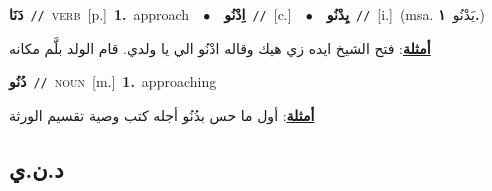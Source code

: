 \documentclass[10pt,a4paper,twoside]{article} %
\begin{document}
\begin{multicols}{2}
{\setlength\topsep{0pt}\textbf{\foreignlanguage{arabic}{دَنَا}}\ {\color{gray}\texttt{//}\color{black}}\ \textsc{verb}\ [p.]\ \textbf{1.}~approach\ \ $\bullet$\ \ \setlength\topsep{0pt}\textbf{\foreignlanguage{arabic}{اِدْنُو}}\ {\color{gray}\texttt{//}\color{black}}\ [c.]\ \ $\bullet$\ \ \setlength\topsep{0pt}\textbf{\foreignlanguage{arabic}{يِدْنُو}}\ {\color{gray}\texttt{//}\color{black}}\ [i.]\ \color{gray}(msa. \foreignlanguage{arabic}{يَدْنُو}~\foreignlanguage{arabic}{\textbf{١.}})\color{black}\  \begin{flushright}\color{gray}\foreignlanguage{arabic}{\textbf{\underline{\foreignlanguage{arabic}{أمثلة}}}: فتح الشيخ ايده زي هيك وقاله ادْنُو الي يا ولدي. قام الولد بلَّم مكانه}\end{flushright}\color{black}} \vspace{2mm}

{\setlength\topsep{0pt}\textbf{\foreignlanguage{arabic}{دُنُو}}\ {\color{gray}\texttt{//}\color{black}}\ \textsc{noun}\ [m.]\ \textbf{1.}~approaching\  \begin{flushright}\color{gray}\foreignlanguage{arabic}{\textbf{\underline{\foreignlanguage{arabic}{أمثلة}}}: أول ما حس بدُنُو أجله كتب وصية تقسيم الورثة}\end{flushright}\color{black}} \vspace{2mm}

\vspace{-3mm}
\subsection*{\color{blue}\foreignlanguage{arabic}{د.ن.ي}\color{blue}{}} 


\end{multicols}
\end{document}
